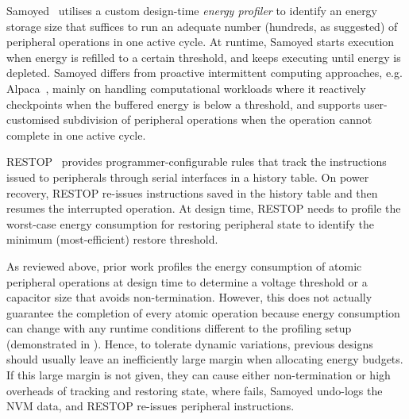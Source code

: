 Samoyed~\cite{maeng2019supporting} utilises a custom design-time \textit{energy profiler} to identify an energy storage size that suffices to run an adequate number (hundreds, as suggested) of peripheral operations in one active cycle. 
At runtime, Samoyed starts execution when energy is refilled to a certain threshold, and keeps executing until energy is depleted. 
Samoyed differs from proactive intermittent computing approaches, e.g. Alpaca~\cite{maeng2017alpaca}, mainly on handling computational workloads where it reactively checkpoints when the buffered energy is below a threshold, and supports user-customised subdivision of peripheral operations when the operation cannot complete in one active cycle. 

RESTOP~\cite{rodriguez2018restop} provides programmer-configurable rules that track the instructions issued to peripherals through serial interfaces in a history table.
On power recovery, RESTOP re-issues instructions saved in the history table and then resumes the interrupted operation. 
At design time, RESTOP needs to profile the worst-case energy consumption for restoring peripheral state to identify the minimum (most-efficient) restore threshold. 




As reviewed above, prior work profiles the energy consumption of atomic peripheral operations at design time to determine a voltage threshold or a capacitor size that avoids non-termination. 
However, this does not actually guarantee the completion of every atomic operation because energy consumption can change with any runtime conditions different to the profiling setup (demonstrated in ). 
Hence, to tolerate dynamic variations, previous designs should usually leave an inefficiently large margin when allocating energy budgets. 
If this large margin is not given, they can cause either non-termination or high overheads of tracking and restoring state, where \debs{} fails, Samoyed undo-logs the NVM data, and RESTOP re-issues peripheral instructions. 


